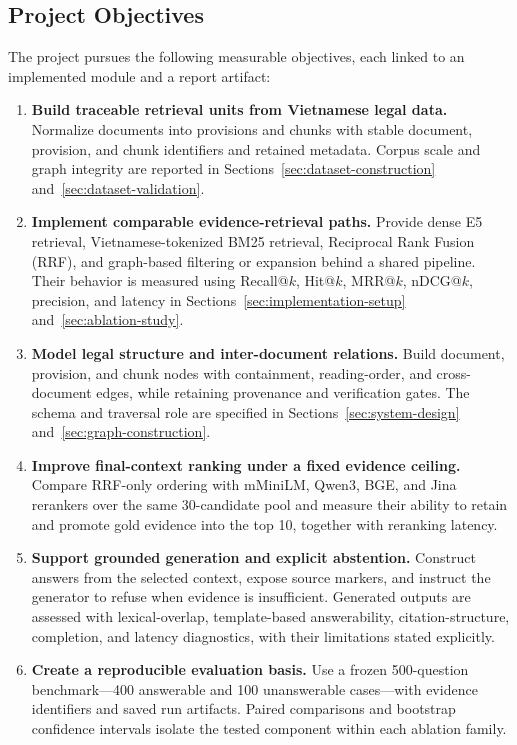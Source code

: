 \subsection{Project Objectives}
\label{sec:objectives}

The project pursues the following measurable objectives, each linked to an
implemented module and a report artifact:

\begin{enumerate}
    \item \textbf{Build traceable retrieval units from Vietnamese legal data.}
    Normalize documents into provisions and chunks with stable document,
    provision, and chunk identifiers and retained metadata. Corpus scale and
    graph integrity are reported in Sections~\ref{sec:dataset-construction}
    and~\ref{sec:dataset-validation}.

    \item \textbf{Implement comparable evidence-retrieval paths.} Provide
    dense E5 retrieval, Vietnamese-tokenized BM25 retrieval, Reciprocal Rank
    Fusion (RRF), and graph-based filtering or expansion behind a shared
    pipeline. Their behavior is measured using Recall@$k$, Hit@$k$, MRR@$k$,
    nDCG@$k$, precision, and latency in
    Sections~\ref{sec:implementation-setup} and~\ref{sec:ablation-study}.

    \item \textbf{Model legal structure and inter-document relations.} Build
    document, provision, and chunk nodes with containment, reading-order, and
    cross-document edges, while retaining provenance and verification gates.
    The schema and traversal role are specified in
    Sections~\ref{sec:system-design} and~\ref{sec:graph-construction}.

    \item \textbf{Improve final-context ranking under a fixed evidence
    ceiling.} Compare RRF-only ordering with mMiniLM, Qwen3, BGE, and Jina
    rerankers over the same 30-candidate pool and measure their ability to
    retain and promote gold evidence into the top 10, together with reranking
    latency.

    \item \textbf{Support grounded generation and explicit abstention.}
    Construct answers from the selected context, expose source markers, and
    instruct the generator to refuse when evidence is insufficient. Generated
    outputs are assessed with lexical-overlap, template-based answerability,
    citation-structure, completion, and latency diagnostics, with their
    limitations stated explicitly.

    \item \textbf{Create a reproducible evaluation basis.} Use a frozen
    500-question benchmark---400 answerable and 100 unanswerable cases---with
    evidence identifiers and saved run artifacts. Paired comparisons and
    bootstrap confidence intervals isolate the tested component within each
    ablation family.
\end{enumerate}

